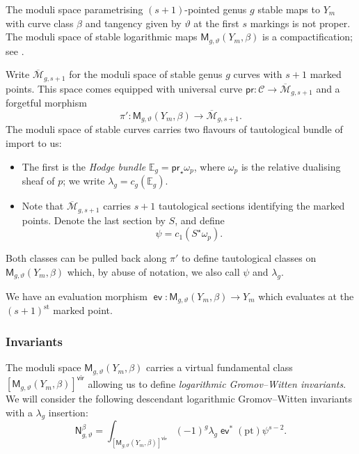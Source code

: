 \documentclass[11pt]{amsart}
\numberwithin{equation}{section}
\theoremstyle{plain}
\theoremstyle{remark}
\theoremstyle{definition}
\DeclareMathOperator{\ev}{\mathsf{ev}}
\newcommand{\supst}[1]{\ensuremath{#1^{\mathrm{st}}}}
\begin{document}
The moduli space parametrising $(s+1)$-pointed genus $g$ stable maps to $Y_m$ with curve class $\beta$ and tangency given by $\vartheta$ at the first $s$ markings is not proper. The moduli space of stable logarithmic maps $\mathsf{M}_{g,\vartheta}(Y_m,\beta)$ is a compactification; see \cite{abramovich2011stable,chen2011stable,gross2012logarithmic}. 

Write $\overline{\mathcal{M}}_{g,s+1}$ for the moduli space of stable genus $g$ curves with $s+1$ marked points. This space comes equipped with universal curve $\mathsf{pr}\colon \mathcal{C} \rightarrow \overline{\mathcal{M}}_{g,s+1}$ and a forgetful morphism
$$\pi'\colon\mathsf{M}_{g,\vartheta}(Y_m,\beta) \longrightarrow \overline{\mathcal{M}}_{g,s+1}.$$
The moduli space of stable curves carries two flavours of tautological bundle of import to us: 
\begin{itemize}\label{label : tautological}
\item The first is the \textit{Hodge bundle} $\mathbb{E}_g = \mathsf{pr}_\star \omega_p$, where $\omega_p$ is the relative dualising sheaf of $p$; we write $\lambda_g = c_g(\mathbb{E}_g)$. 
\item Note that $\overline{\mathcal{M}}_{g,s+1}$ carries $s+1$ tautological sections identifying the marked points. Denote the last section by $S$, and define
  $$\psi = c_{1}\left(S^\star \omega_p\right).$$ 
\end{itemize} 
Both classes can be pulled back along $\pi'$ to define tautological classes on $\mathsf{M}_{g,\vartheta}(Y_m,\beta)$ which, by abuse of notation, we also call  $\psi$ and $\lambda_g$. 

We have an evaluation morphism $\ev \colon \mathsf{M}_{g,\vartheta}(Y_m,\beta) \rightarrow Y_m$ which evaluates at the $\supst{(s+1)}$ marked point. 

\subsubsection{Invariants}\label{Section : invariants}
The moduli space $\mathsf{M}_{g,\vartheta}(Y_m,\beta)$ carries a virtual fundamental class $\left[\mathsf{M}_{g,\vartheta}(Y_m,\beta)\right]^\mathsf{vir}$ allowing us to define \textit{logarithmic Gromov--Witten invariants}. We will consider the following descendant logarithmic Gromov--Witten invariants with a $\lambda_g$ insertion:
$$\mathsf{N}_{g,\vartheta}^{\beta} = \int_{\left[\mathsf{M}_{g,\vartheta}(Y_m,\beta)\right]^\mathsf{vir}}(-1)^g\lambda_g \ev^* (\mathrm{pt}) \psi^{s-2}.$$
\end{document}

